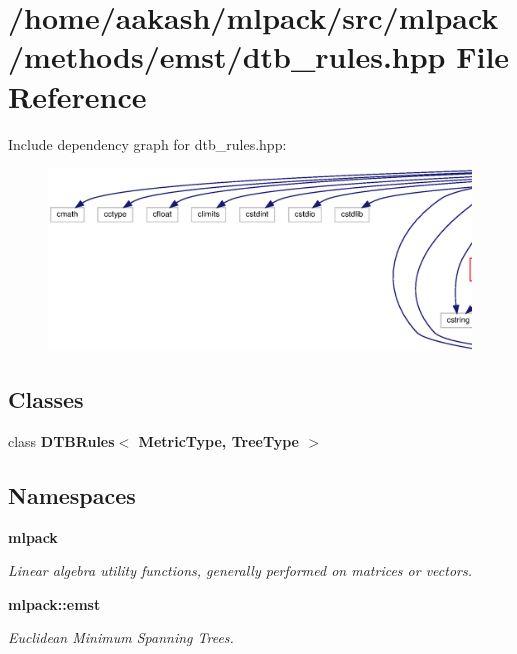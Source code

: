 \section{/home/aakash/mlpack/src/mlpack/methods/emst/dtb\+\_\+rules.hpp File Reference}
\label{dtb__rules_8hpp}
Include dependency graph for dtb\+\_\+rules.\+hpp\+:
\nopagebreak
\begin{figure}[H]
\begin{center}
\leavevmode
\includegraphics[width=350pt]{dtb__rules_8hpp__incl}
\end{center}
\end{figure}
\subsection*{Classes}
\begin{DoxyCompactItemize}
\item 
class \textbf{ D\+T\+B\+Rules$<$ Metric\+Type, Tree\+Type $>$}
\end{DoxyCompactItemize}
\subsection*{Namespaces}
\begin{DoxyCompactItemize}
\item 
 \textbf{ mlpack}
\begin{DoxyCompactList}\small\item\em Linear algebra utility functions, generally performed on matrices or vectors. \end{DoxyCompactList}\item 
 \textbf{ mlpack\+::emst}
\begin{DoxyCompactList}\small\item\em Euclidean Minimum Spanning Trees. \end{DoxyCompactList}\end{DoxyCompactItemize}


